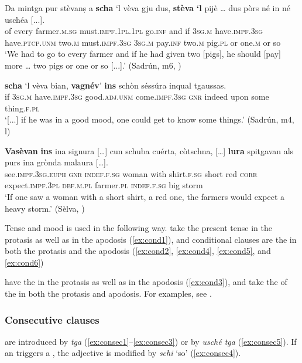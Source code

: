 \ea
\label{ex:cond4}
\gll Da mintga pur stèvanṣ  a \textbf{scha} `l vèva gju dus, \textbf{stèva} \textbf{`l} pijè …  dus pòrs né in né uschéa [...].\\
of every farmer.\textsc{m.sg} must.\textsc{impf.1pl.1pl} go.\textsc{inf} and if \textsc{3sg.m} have.\textsc{impf.3sg} have.\textsc{ptcp.unm} two.\textsc{m} must.\textsc{impf.3sg}  \textsc{3sg.m} pay.\textsc{inf} {} two.\textsc{m} pig.\textsc{pl} or one.\textsc{m} or so\\
\glt `We had to go to every farmer and if he had given two [pigs], he should [pay] more … two pigs or one or so [...].' (Sadrún, m6, )
\z

\ea
\label{ex:cond5}
\gll  [...] \textbf{scha} `l vèva bian, \textbf{vagnév}’ \textbf{ins} schòn séssúra inqual tgaussas.\\
{} if \textsc{3sg.m}  have.\textsc{impf.3sg} good.\textsc{adj.unm} come.\textsc{impf.3sg} \textsc{gnr} indeed upon some thing.\textsc{f.pl} \\
\glt `[...] if he was in a good mood, one could get to know some things.' (Sadrún, m4, l)
\z

\ea
\label{ex:cond6}
\gll    \textbf{Vasèvan} \textbf{ins} ina signura […] cun schuba cuérta, còtschna, […] \textbf{lura} spitgavan als purs ina grònda malaura […].\\
     see.\textsc{impf.3sg.euph} \textsc{gnr} \textsc{indef.f.sg} woman {} with shirt.\textsc{f.sg} short red {} \textsc{corr} expect.\textsc{impf.3pl} \textsc{def.m.pl} farmer.\textsc{pl} \textsc{indef.f.sg} big storm\\
\glt `If one saw a woman with a short shirt, a red one, the farmers would expect a heavy storm.' (Sèlva, \citealt[34]{Büchli1966})
\z

Tense and mood is used in the following way.  take the present tense in the protasis as well as in the apodosis (\ref{ex:cond1}), and  {conditional clauses} are the  in both the protasis and the apodosis (\ref{ex:cond2}, \ref{ex:cond4}, \ref{ex:cond5}, and \ref{ex:cond6})

 have the  in the protasis as well as in the apodosis (\ref{ex:cond3}), and  take the of the  in both the protasis and apodosis. For examples, see .

\subsubsection{Consecutive clauses}\label{sec:6.2.2.6}
 are introduced by \textit{tga} (\ref{ex:consec1}--\ref{ex:consec3}) or by \textit{usché tga} (\ref{ex:consec5}). If an  triggers a , the adjective is modified by \textit{schi} `so' (\ref{ex:consec4}).

